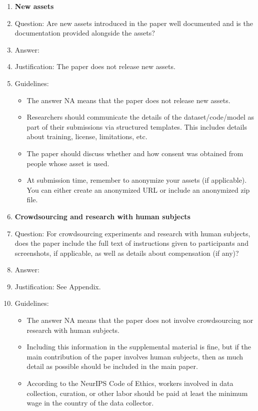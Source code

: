 \documentclass{article}
\begin{document}
\begin{enumerate}
\item {\bf New assets}
    \item[] Question: Are new assets introduced in the paper well documented and is the documentation provided alongside the assets?
    \item[] Answer: \answerNA{} %
    \item[] Justification: The paper does not release new assets.
    \item[] Guidelines:
    \begin{itemize}
        \item The answer NA means that the paper does not release new assets.
        \item Researchers should communicate the details of the dataset/code/model as part of their submissions via structured templates. This includes details about training, license, limitations, etc. 
        \item The paper should discuss whether and how consent was obtained from people whose asset is used.
        \item At submission time, remember to anonymize your assets (if applicable). You can either create an anonymized URL or include an anonymized zip file.
    \end{itemize}

\item {\bf Crowdsourcing and research with human subjects}
    \item[] Question: For crowdsourcing experiments and research with human subjects, does the paper include the full text of instructions given to participants and screenshots, if applicable, as well as details about compensation (if any)? 
    \item[] Answer: \answerYes{} %
    \item[] Justification: See Appendix.
    \item[] Guidelines:
    \begin{itemize}
        \item The answer NA means that the paper does not involve crowdsourcing nor research with human subjects.
        \item Including this information in the supplemental material is fine, but if the main contribution of the paper involves human subjects, then as much detail as possible should be included in the main paper. 
        \item According to the NeurIPS Code of Ethics, workers involved in data collection, curation, or other labor should be paid at least the minimum wage in the country of the data collector. 
    \end{itemize}


\end{enumerate}
\end{document}
